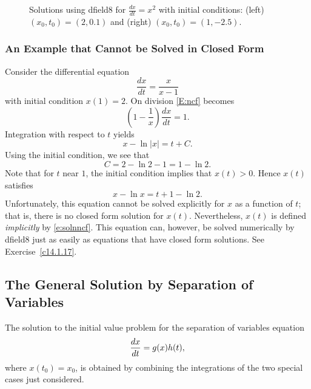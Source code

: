 \documentclass{ximera}
\begin{document}
\begin{figure*}[htb]
           \centerline{%
	   }
           \caption{Solutions using {\sf dfield8} for $\frac{dx}{dt} = x^2$ 
		with initial conditions: (left) $(x_0,t_0)=(2,0.1)$ and 
		(right) $(x_0,t_0)=(1,-2.5)$.}
           \label{F:x^2}
\end{figure*}

\subsubsection*{An Example that Cannot be Solved in Closed Form}

Consider the differential equation
\begin{equation}  \label{E:ncf}
\frac{dx}{dt} = \frac{x}{x-1}
\end{equation}
with initial condition $x(1)=2$. On division \eqref{E:ncf} becomes 
\[
\left(1-\frac{1}{x}\right)\frac{dx}{dt} = 1.
\]
Integration with respect to $t$ yields
\[
x - \ln|x| = t + C.
\]
Using the initial condition, we see that 
\[
C = 2 - \ln 2 -1 = 1 - \ln 2.
\]
Note that for $t$ near $1$, the initial condition implies that $x(t)>0$.  
Hence $x(t)$ satisfies
\begin{equation} \label{e:solnncf}
x -\ln x = t + 1 - \ln 2.
\end{equation}
Unfortunately, this equation cannot be solved explicitly for $x$ 
as a function of $t$; that is, there is no closed form 
solution 
for $x(t)$.  Nevertheless, $x(t)$ is defined 
{\em implicitly\/} 
by \eqref{e:solnncf}.  This equation can, however, be solved numerically by
{\sf dfield8} just as easily as equations that have closed form solutions.
See Exercise~\ref{c14.1.17}. 

\subsection*{The General Solution by Separation of Variables}

The solution to the initial value problem for the separation
of variables equation
\begin{equation}  \label{eq:ghivp}
\displaystyle \frac{dx}{dt} =  g(x) h(t),
\end{equation}
where $x(t_0) = x_0$, is obtained by combining the integrations of the two 
special cases just considered.  
\end{document}
